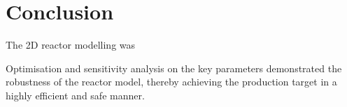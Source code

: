 \section{Conclusion} \label{sec:conclusion}

The 2D reactor modelling was 

Optimisation and sensitivity analysis on the key parameters demonstrated the robustness of the reactor model, thereby achieving the production target in a highly efficient and safe manner. 